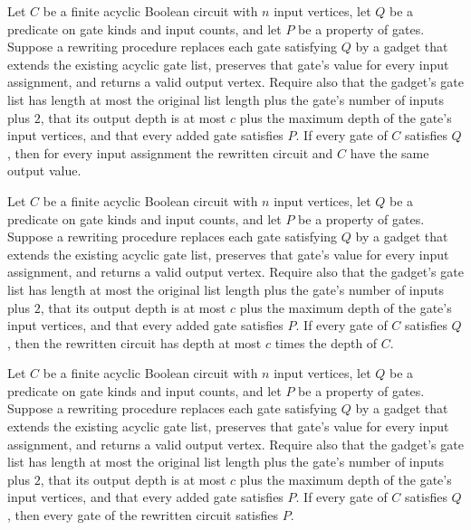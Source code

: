 \begin{theorem}
\label{BoolCircuit.DAGCircuit.rewrite_eval}
\leanok
{}
Let $C$ be a finite acyclic Boolean circuit with $n$ input vertices, let $Q$ be a
predicate on gate kinds and input counts, and let $P$ be a property of gates. Suppose a
rewriting procedure replaces each gate satisfying $Q$ by a gadget that extends the
existing acyclic gate list, preserves that gate's value for every input assignment, and
returns a valid output vertex. Require also that the gadget's gate list has length at
most the original list length plus the gate's number of inputs plus $2$, that its output
depth is at most $c$ plus the maximum depth of the gate's input vertices, and that every
added gate satisfies $P$. If every gate of $C$ satisfies $Q$, then for every input
assignment the rewritten circuit and $C$ have the same output value.
\end{theorem}

\begin{theorem}
\label{BoolCircuit.DAGCircuit.rewrite_depth_le}
\leanok
{}
Let $C$ be a finite acyclic Boolean circuit with $n$ input vertices, let $Q$ be a
predicate on gate kinds and input counts, and let $P$ be a property of gates. Suppose a
rewriting procedure replaces each gate satisfying $Q$ by a gadget that extends the
existing acyclic gate list, preserves that gate's value for every input assignment, and
returns a valid output vertex. Require also that the gadget's gate list has length at
most the original list length plus the gate's number of inputs plus $2$, that its output
depth is at most $c$ plus the maximum depth of the gate's input vertices, and that every
added gate satisfies $P$. If every gate of $C$ satisfies $Q$, then the rewritten circuit
has depth at most $c$ times the depth of $C$.
\end{theorem}

\begin{theorem}
\label{BoolCircuit.DAGCircuit.rewrite_new_gates}
\leanok
{}
Let $C$ be a finite acyclic Boolean circuit with $n$ input vertices, let $Q$ be a
predicate on gate kinds and input counts, and let $P$ be a property of gates. Suppose a
rewriting procedure replaces each gate satisfying $Q$ by a gadget that extends the
existing acyclic gate list, preserves that gate's value for every input assignment, and
returns a valid output vertex. Require also that the gadget's gate list has length at
most the original list length plus the gate's number of inputs plus $2$, that its output
depth is at most $c$ plus the maximum depth of the gate's input vertices, and that every
added gate satisfies $P$. If every gate of $C$ satisfies $Q$, then every gate of the
rewritten circuit satisfies $P$.
\end{theorem}

